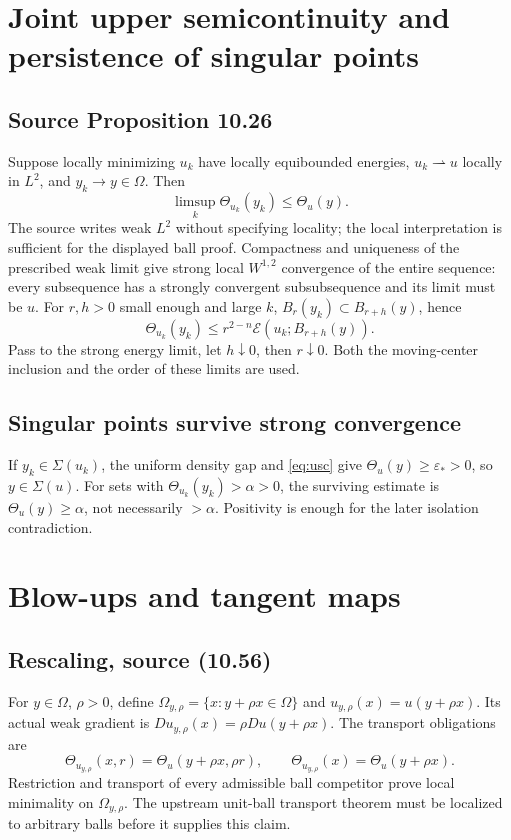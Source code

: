 \documentclass[11pt,a4paper]{article}
\numberwithin{equation}{section}
\theoremstyle{definition}
\theoremstyle{remark}
\newcommand{\E}{\mathcal E}
\newcommand{\Th}{\Theta}
\begin{document}
\section{Joint upper semicontinuity and persistence of singular points}
\subsection{Source Proposition 10.26}\label{prop:density-usc}
Suppose locally minimizing $u_k$ have locally equibounded energies,
$u_k\rightharpoonup u$ locally in $L^2$, and $y_k\to y\in\Omega$.
Then
\begin{equation}\label{eq:usc}
 \limsup_k\Th_{u_k}(y_k)\le\Th_u(y).
\end{equation}
The source writes weak $L^2$ without specifying locality; the local
interpretation is sufficient for the displayed ball proof. Compactness
and uniqueness of the prescribed weak limit give strong local $W^{1,2}$
convergence of the entire sequence: every subsequence has a strongly
convergent subsubsequence and its limit must be $u$.
For $r,h>0$ small enough and large $k$,
$B_r(y_k)\subset B_{r+h}(y)$, hence
\[
 \Th_{u_k}(y_k)\le r^{2-n}\E(u_k;B_{r+h}(y)).
\]
Pass to the strong energy limit, let $h\downarrow0$, then $r\downarrow0$.
Both the moving-center inclusion and the order of these limits are used.

\subsection{Singular points survive strong convergence}
\label{lem:singular-persistence}
If $y_k\in\Sigma(u_k)$, the uniform density gap and
\eqref{eq:usc} give $\Th_u(y)\ge\varepsilon_*>0$, so $y\in\Sigma(u)$.
For sets with $\Th_{u_k}(y_k)>\alpha>0$, the surviving estimate is
$\Th_u(y)\ge\alpha$, not necessarily $>\alpha$. Positivity is enough
for the later isolation contradiction.

\section{Blow-ups and tangent maps}
\subsection{Rescaling, source (10.56)}\label{def:blowup}
For $y\in\Omega$, $\rho>0$, define
$\Omega_{y,\rho}=\{x:y+\rho x\in\Omega\}$ and
$u_{y,\rho}(x)=u(y+\rho x)$. Its actual weak gradient is
$Du_{y,\rho}(x)=\rho Du(y+\rho x)$. The transport obligations are
\begin{equation}\label{eq:rescaling}
 \Th_{u_{y,\rho}}(x,r)=\Th_u(y+\rho x,\rho r),\qquad
 \Th_{u_{y,\rho}}(x)=\Th_u(y+\rho x).
\end{equation}
Restriction and transport of every admissible ball competitor prove local
minimality on $\Omega_{y,\rho}$. The upstream unit-ball transport theorem
must be localized to arbitrary balls before it supplies this claim.
\end{document}
